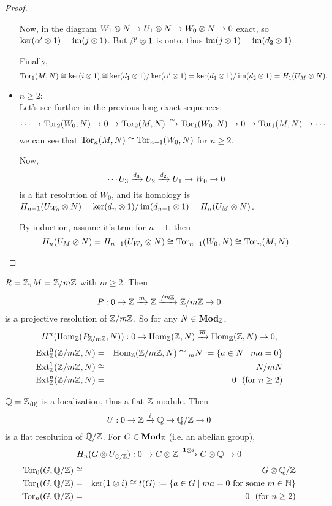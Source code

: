 \begin{theorem}
\begin{proof}
\begin{itemize}
    Now, in the diagram $W_1 \otimes N \to U_1 \otimes N \to W_0 \otimes N \to 0$ exact, so 
    $\ker (\alpha' \otimes 1) = \operatorname{im} (j \otimes 1)$. But $\beta' \otimes 1$ is onto, thus 
    $\operatorname{im} (j \otimes 1) = \operatorname{im} (d_2 \otimes 1)$. 

    Finally, 
    $$\operatorname{Tor}_1(M, N) \cong \ker(i \otimes 1) \cong \ker (d_1 \otimes 1) / \ker(\alpha' \otimes 1)
    = \ker (d_1 \otimes 1) / \operatorname{im}(d_2 \otimes 1) = H_1(U_M \otimes N).$$

    \item $n \ge 2$: \\
      Let's see further in the previous long exact sequences:
      $$
        \cdots \to \operatorname{Tor}_2(W_0, N) \to 0 \to \operatorname{Tor}_2(M, N)
        \xrightarrow{\sim} \operatorname{Tor}_1(W_0, N) \to 0 \to \operatorname{Tor}_1(M, N) \to \cdots
      $$
      we can see that $\operatorname{Tor}_n(M, N) \cong \operatorname{Tor}_{n-1}(W_0, N)$ for $n \ge 2$.

      Now, 
      $$\cdots U_3 \xrightarrow{d_3} U_2 \xrightarrow{d_2} U_1 \to W_0 \to 0$$
      is a flat resolution of $W_0$, and its homology is 
      $H_{n-1}(U_{W_0} \otimes N) = \ker(d_n \otimes 1) / \operatorname{im}(d_{n-1} \otimes 1) = H_n(U_M \otimes N)$.

      By induction, assume it's true for $n-1$, then
      $$
        H_n(U_M \otimes N) = H_{n-1}(U_{W_0} \otimes N) \cong \operatorname{Tor}_{n-1}(W_0, N) \cong \operatorname{Tor}_n(M, N).
      $$
      \qedhere
    \end{itemize}
  \end{proof}
\end{theorem}

\begin{example}
  $R = \mathbb{Z}, M = \mathbb{Z}/m\mathbb{Z}$ with $m \ge 2$. Then
  $$P : 0 \to \mathbb{Z} \xrightarrow{m} \mathbb{Z} \xrightarrow{/m\mathbb{Z}} \mathbb{Z}/m\mathbb{Z} \to 0$$
  is a projective resolution of $\mathbb{Z}/m\mathbb{Z}$. So for any $N \in \mathbf{Mod}_{\mathbb{Z}}$,
  $$H^n(\operatorname{Hom}_{\mathbb{Z}}(P_{\mathbb{Z}/m\mathbb{Z}}, N)) : 0 \to \operatorname{Hom}_{\mathbb{Z}}(\mathbb{Z}, N) \xrightarrow{\overline{m}} \operatorname{Hom}_{\mathbb{Z}}(\mathbb{Z}, N) \to 0,$$
  \begin{eqnarray*}
    \operatorname{Ext}_{\mathbb{Z}}^0(\mathbb{Z}/m\mathbb{Z}, N) &=& \operatorname{Hom}_{\mathbb{Z}}(\mathbb{Z}/m\mathbb{Z}, N) \cong {}_m N \vcentcolon= \{a \in N \mid ma = 0\}\\
    \operatorname{Ext}_{\mathbb{Z}}^1(\mathbb{Z}/m\mathbb{Z}, N) &\cong& N / mN \\
    \operatorname{Ext}_{\mathbb{Z}}^n(\mathbb{Z}/m\mathbb{Z}, N) &=& 0\ \ (\textrm{for } n \ge 2)
  \end{eqnarray*}
\end{example}

\begin{example}
  $\mathbb{Q} = \mathbb{Z}_{\langle 0 \rangle}$ is a localization, thus a flat $\mathbb{Z}$ module.
  Then
  $$U : 0 \to \mathbb{Z} \xrightarrow{i} \mathbb{Q} \to \mathbb{Q}/\mathbb{Z} \to 0$$
  is a flat resolution of $\mathbb{Q}/\mathbb{Z}$. For $G \in \mathbf{Mod}_{\mathbb{Z}}$ (i.e. an abelian group),
  $$H_n(G \otimes U_{\mathbb{Q}/\mathbb{Z}}) : 0 \to G \otimes \mathbb{Z} \xrightarrow{\mathbf{1} \otimes i} G \otimes \mathbb{Q} \to 0$$
  \begin{eqnarray*}
    \operatorname{Tor}_0(G, \mathbb{Q}/\mathbb{Z}) &\cong& G \otimes \mathbb{Q}/\mathbb{Z} \\
    \operatorname{Tor}_1(G, \mathbb{Q}/\mathbb{Z}) &=& \ker(\mathbf{1} \otimes i) \cong t(G) \vcentcolon=
    \lbrace a \in G \mid ma = 0 \textrm{ for some } m \in \mathbb{N}\rbrace \\
    \operatorname{Tor}_n(G, \mathbb{Q}/\mathbb{Z}) &=& 0\ \ (\textrm{for } n \ge 2)
  \end{eqnarray*}
\end{example}

